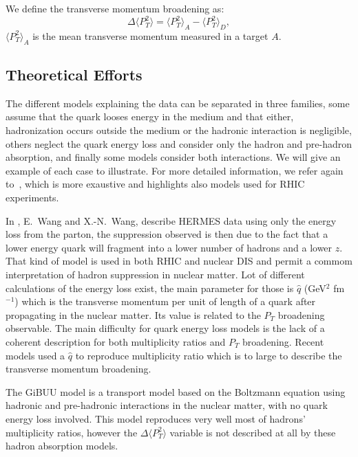 We define the transverse momentum broadening as:
\begin{equation}
\Delta \langle P_T^2 \rangle = \langle P_T^2 \rangle_A - \langle P_T^2 \rangle_D,
\end{equation}
$\langle P_T^2 \rangle_A$ is the mean transverse momentum measured in a target $A$.


\subsection{Theoretical Efforts}
\label{sec:theo}

The different models explaining the data can be separated in three families,
some assume that the quark looses energy in the medium and that either, hadronization occurs
outside the medium or the hadronic interaction is 
negligible, others neglect the quark energy loss and consider
only the hadron and pre-hadron absorption, and finally some models consider both
interactions. We will give an example of each case to illustrate. For more
detailed information, we refer again to~\cite{Accardi:2009qv}, which is more exaustive and
highlights also models used for RHIC experiments.

In \cite{Wang:2002ri}, E.~Wang and X.-N.~Wang, describe HERMES data using only 
the energy 
loss from the parton, the suppression observed is then due to the fact that a 
lower energy quark will fragment into a lower number of hadrons and a lower 
$z$. That kind of model is used in both RHIC and nuclear DIS and permit a commom 
interpretation of hadron suppression in nuclear matter. Lot of different
calculations of the energy loss exist, the main parameter for those is $\hat q$
(GeV$^2$ fm$^{-1}$) which is the transverse momentum per unit of length of a 
quark after propagating in the nuclear matter. Its value is related to the $P_T$ 
broadening observable. The main difficulty for quark energy loss
models is the lack of a coherent description for both multiplicity ratios and $P_T$ 
broadening. Recent models used a $\hat q$ to reproduce multiplicity ratio
which is to large to describe the transverse momentum broadening.

The GiBUU model \cite{Gallmeister:2007an} is a transport model based on the 
Boltzmann equation
using hadronic and pre-hadronic interactions in the nuclear matter, with no
quark energy loss involved. This model reproduces very well most of hadrons'
multiplicity ratios, 
however the $\Delta \langle P_T^2 \rangle$ variable is not described at all by 
these hadron absorption models.

